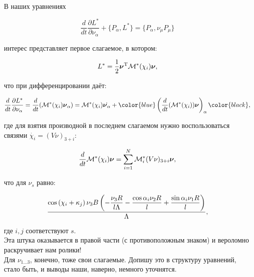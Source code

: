 \documentclass{article}
\begin{document}


В наших уравнениях

\begin{equation}
    \frac{d}{dt}\frac{\partial L^{*}}{\partial \nu_\alpha}  + \{P_\alpha, L^{*}\} = \{P_\alpha, \nu_\mu P_\mu\}
\end{equation}

интерес представляет первое слагаемое, в котором:

\begin{equation}
    L^{*} = \frac{1}{2}\boldsymbol{\mathbf{\nu}}^\mathrm{T} \mathcal{M}^*(\chi_i)\boldsymbol{\mathbf{\nu}},
\end{equation}

что при дифференцировании даёт:

\begin{equation}
    \frac{d}{dt}\frac{\partial L^{*}}{\partial \nu_\alpha} = \frac{d}{dt}(\M^*(\chi_i)\vec{\nu}_\alpha) = 
    \M^*(\chi_i)\dot{\vec{\nu}_\alpha} +
    \color{blue}
    \left(\frac{d}{dt}(\M^*(\chi_i))\vec{\nu}\right)_\alpha
    \color{black},
\end{equation}

где для взятия производной в последнем слагаемом нужно воспользоваться связями $\dot{\chi_i} = (V\nu)_{3+i}$:

\begin{equation}
    \displaystyle\frac{\displaystyle d}{\displaystyle dt}\mathcal{M}^*(\chi_i)\boldsymbol{\mathbf{\nu}} = \sum_{i=1}^{N}\mathcal{M}^*_i(V\nu)_{3+i}\boldsymbol{\mathbf{\nu}},
\end{equation}

что для $\nu_{s}$ равно:

\begin{equation}
    \frac{\cos\left( \chi_i+\kappa_j\right) \nu_3 B \left( -\displaystyle\frac{\displaystyle \nu_3 R}{\displaystyle l \Lambda}-\displaystyle\frac{\displaystyle \cos\alpha_i \nu_2 R}{\displaystyle l}+\displaystyle\frac{\displaystyle \sin\alpha_i \nu_1 R}{\displaystyle l}\right) }{\Lambda},
\end{equation}

где $i,j$ соответствуют $s$. \\

Эта штука оказывается в правой части (с противоположным знаком) и вероломно раскручивает нам ролики! \\

Для $\nu_{1\ldots3}$, конечно, тоже свои слагаемые. Допишу это в структуру уравнений, стало быть, и выводы наши, наверно, немного уточнятся.
\end{document}
